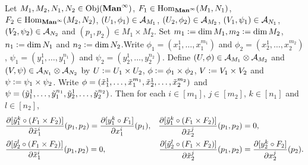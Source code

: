 \documentclass{book}
\begin{document}
	\begin{ex} 
		Let $M_1, M_2, N_1, N_2 \in \operatorname{Obj}(\operatorname*{\text{\textbf{Man}}^{\infty}})$, $F_1 \in \operatorname{Hom}_{\operatorname*{\text{\textbf{Man}}^{\infty}}}(M_1, N_1)$, $F_2 \in \operatorname{Hom}_{\operatorname*{\text{\textbf{Man}}^{\infty}}}(M_2, N_2)$, $(U_1, \phi_1) \in \mathcal{A}_{M_1}$, $(U_2, \phi_2) \in \mathcal{A}_{M_2}$, $(V_1, \psi_1) \in \mathcal{A}_{N_1}$, $(V_2, \psi_2) \in \mathcal{A}_{N_2}$ and $(p_1, p_2) \in M_1 \times M_2$. Set $m_1 \vcentcolon= \dim M_1, m_2 \vcentcolon= \dim M_2$, $n_1 \vcentcolon= \dim N_1$ and $n_2 \vcentcolon= \dim N_2$.Write $\phi_1 = (x_1^1, \ldots, x_1^{m_1})$ and $\phi_2 = (x_2^1, \ldots, x_2^{m_2})$, $\psi_1 = (y_1^1, \ldots, y_1^{n_1})$ and $\psi_2 = (y_2^1, \ldots, y_2^{n_2})$. Define $(U, \phi) \in \mathcal{A}_{M_1} \otimes \mathcal{A}_{M_2}$ and $(V, \psi) \in \mathcal{A}_{N_1} \otimes \mathcal{A}_{N_2}$ by $U \vcentcolon= U_1 \times U_2$, $\phi \vcentcolon= \phi_1 \times \phi_2$, $V \vcentcolon= V_1 \times V_2$ and $\psi \vcentcolon= \psi_1 \times \psi_2$. Write $\phi = (\tilde{x}_1^1, \ldots, \tilde{x}_1^{m_1}, \tilde{x}_2^1, \ldots, \tilde{x}_2^{m_2})$ and $\psi = (\tilde{y}_1^1, \ldots, \tilde{y}_1^{n_1}, \tilde{y}_2^1, \ldots, \tilde{y}_2^{n_2})$. Then for each $i \in [m_1]$, $j \in [m_2]$, $k \in [n_1]$ and $l \in [n_2]$,
		\begin{align*}
			& \frac{\partial [\tilde{y}_1^k \circ (F_1 \times F_2)]}{\partial \tilde{x}_1^i}(p_1, p_2) = \frac{\partial [y^k_1 \circ F_1]}{\partial x_1^i} (p_1), 
			& \frac{\partial [\tilde{y}_1^k \circ (F_1 \times F_2)]}{\partial \tilde{x}_2^j}(p_1, p_2) & = 0, \\
			& \frac{\partial [\tilde{y}_2^l \circ (F_1 \times F_2)]}{\partial \tilde{x}_1^i}(p_1, p_2) = 0, 
			& \frac{\partial [\tilde{y}_2^l \circ (F_1 \times F_2)]}{\partial \tilde{x}_2^j}(p_1, p_2) &=  \frac{\partial [y^k_2 \circ F_2]}{\partial x_2^j} (p_2).
		\end{align*}
	\end{ex}
\end{document}
